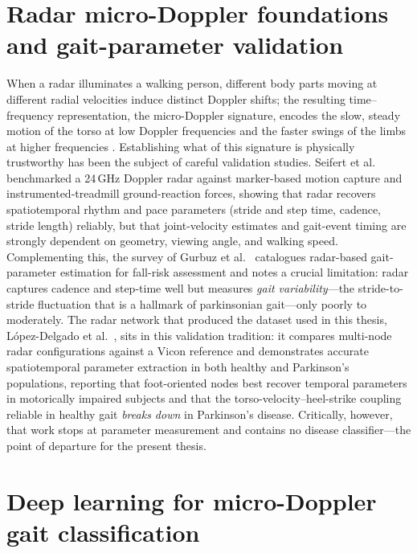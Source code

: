 \section{Radar micro-Doppler foundations and gait-parameter validation}
\label{sec:foundations}

When a radar illuminates a walking person, different body parts moving at
different radial velocities induce distinct Doppler shifts; the resulting
time--frequency representation, the micro-Doppler signature, encodes the slow,
steady motion of the torso at low Doppler frequencies and the faster swings of
the limbs at higher frequencies \cite{seifert2020}. Establishing what of this
signature is physically trustworthy has been the subject of careful validation
studies. Seifert et al.\ \cite{seifert2020} benchmarked a 24\,GHz Doppler radar
against marker-based motion capture and instrumented-treadmill ground-reaction
forces, showing that radar recovers spatiotemporal rhythm and pace parameters
(stride and step time, cadence, stride length) reliably, but that joint-velocity
estimates and gait-event timing are strongly dependent on geometry, viewing
angle, and walking speed. Complementing this, the survey of Gurbuz et al.\
\cite{gurbuz2024} catalogues radar-based gait-parameter estimation for fall-risk
assessment and notes a crucial limitation: radar captures cadence and step-time
well but measures \emph{gait variability}---the stride-to-stride fluctuation
that is a hallmark of parkinsonian gait---only poorly to moderately. The radar
network that produced the dataset used in this thesis, López-Delgado et al.\
\cite{lopezdelgado2026}, sits in this validation tradition: it compares
multi-node radar configurations against a Vicon reference and demonstrates
accurate spatiotemporal parameter extraction in both healthy and Parkinson's
populations, reporting that foot-oriented nodes best recover temporal parameters
in motorically impaired subjects and that the torso-velocity--heel-strike
coupling reliable in healthy gait \emph{breaks down} in Parkinson's disease.
Critically, however, that work stops at parameter measurement and contains no
disease classifier---the point of departure for the present thesis.

\section{Deep learning for micro-Doppler gait classification}
\label{sec:dl}

